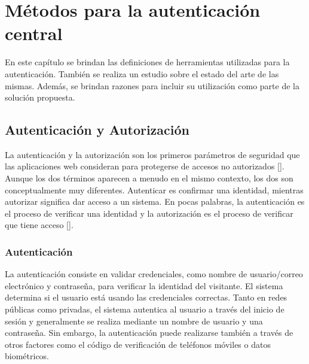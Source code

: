 
\chapter{Métodos para la autenticación central}\label{chapter:state-of-the-art}
En este capítulo se brindan las definiciones de herramientas utilizadas para la autenticación. También se realiza un estudio sobre el estado del arte de las mismas. Además, se brindan razones para incluir su utilización como parte de la solución propuesta.

\section{Autenticación y Autorización}
La autenticación y la autorización son los primeros parámetros de seguridad que las aplicaciones web consideran para protegerse de accesos no autorizados [\cite{deitel2014como}].  Aunque los dos términos aparecen a menudo en el mismo contexto, los dos son conceptualmente muy diferentes. Autenticar es confirmar una identidad, mientras autorizar significa dar acceso a un sistema. En pocas palabras, la autenticación es el proceso de verificar una identidad y la autorización es el proceso de verificar que tiene acceso [\cite{ye2022diseno}].

\subsection{Autenticación} \label{authentication}
La autenticación consiste en validar credenciales, como nombre de usuario/correo electrónico y contraseña, para verificar la identidad del visitante. El sistema determina si el usuario está usando las credenciales correctas. Tanto en redes públicas como privadas, el sistema autentica al usuario a través del inicio de sesión y generalmente se realiza mediante un nombre de usuario y
una contraseña. Sin embargo, la autenticación puede realizarse  también a través de otros factores como el código de verificación de teléfonos móviles o datos biométricos.

